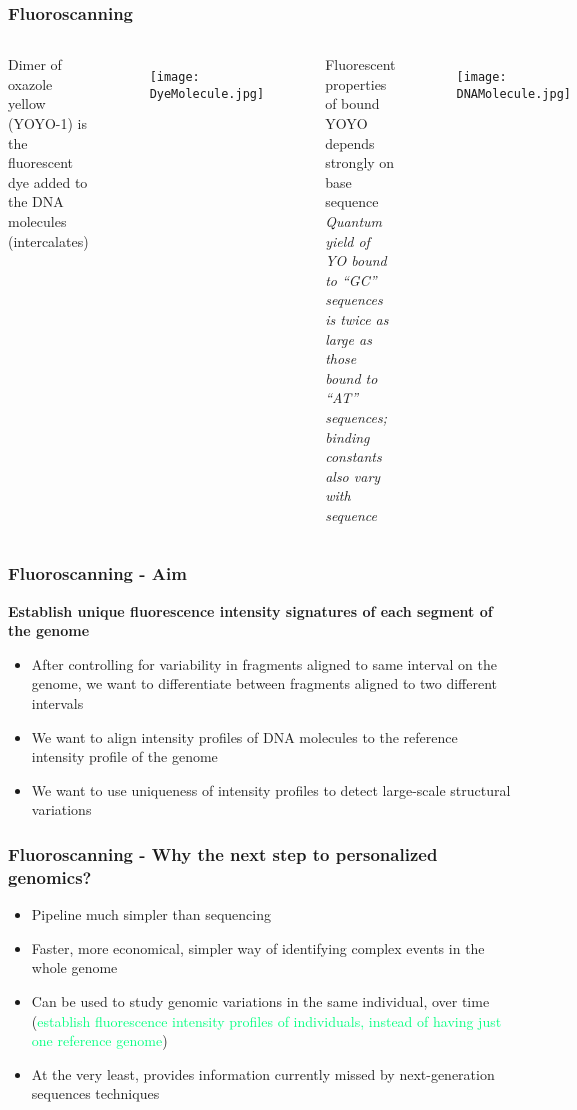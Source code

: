 \documentclass[10pt,dvipsnames,table]{beamer}
\begin{document}
\begin{frame}
\frametitle{Fluoroscanning}
\begin{columns}
Dimer of oxazole yellow (YOYO-1) is the fluorescent dye added to the DNA molecules (intercalates) \\
\vspace{1cm}
\begin{figure}
\texttt{[image: DyeMolecule.jpg]}
\end{figure}

\pause
{} 
Fluorescent properties of bound YOYO depends strongly on base sequence \\
\vspace{1cm}
{\emph{Quantum yield of YO bound to “GC” sequences is twice as large as those bound to “AT” sequences; binding constants also vary with sequence}}
\begin{figure}
\texttt{[image: DNAMolecule.jpg]}
\end{figure}
\end{columns}
\end{frame}

\begin{frame}
\frametitle{Fluoroscanning - Aim}
{\bf{\large Establish unique fluorescence intensity signatures of each segment of the genome}}
\begin{itemize}
\item After controlling for variability in fragments aligned to same interval on the genome, we want to differentiate between fragments aligned to two different intervals
\item We want to align intensity profiles of DNA molecules to the reference intensity profile of the genome
\item We want to use uniqueness of intensity profiles to detect large-scale structural variations
\end{itemize}
\end{frame}

\begin{frame}
\frametitle{Fluoroscanning - Why the next step to personalized genomics?}
\begin{itemize}
\item Pipeline much simpler than sequencing
\item Faster, more economical, simpler way of identifying complex events in the whole genome
\item Can be used to study genomic variations in the same individual, over time (\textcolor{SpringGreen} {establish fluorescence intensity profiles of individuals, instead of having just one reference genome})
\item At the very least, provides information currently missed by next-generation sequences techniques
\end{itemize}
\end{frame}
\end{document}
